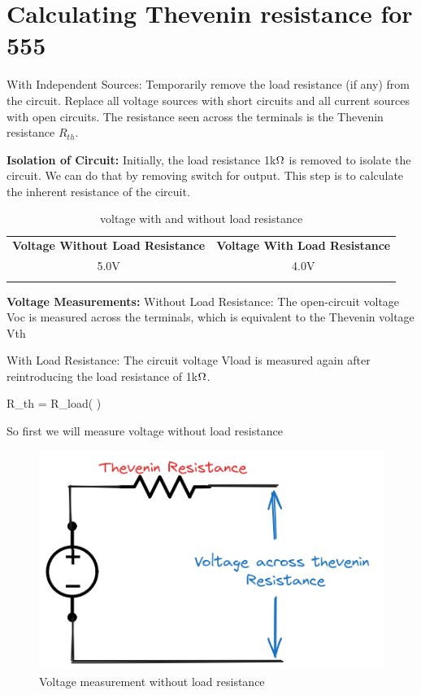 \documentclass[a4paper,11pt]{article}%
\begin{document}
\section{Calculating Thevenin resistance for 555}

With Independent Sources: Temporarily remove the load resistance (if any) from the circuit. Replace all voltage sources with short circuits and all current sources with open circuits. The resistance seen across the terminals is the Thevenin resistance $R_{th}$.

	\textbf{Isolation of Circuit:} Initially, the load resistance 1k$\ohm$ is removed to isolate the circuit. We can do that by removing switch for output. This step is to calculate the inherent resistance of the circuit.


	\begin{table}[H]
		\centering
	
		\begin{tabular}{c c}
	
			\textbf{Voltage Without Load Resistance}&\textbf{Voltage With Load Resistance}\\
			
			5.0V&4.0V\\\vspace{0.5cm}

		\end{tabular}
		\caption{voltage with and without load resistance}
		\label{voltagewithandwithoutresistance}
	\end{table}

	\textbf{Voltage Measurements:}
		Without Load Resistance: The open-circuit voltage Voc
  is measured across the terminals, which is equivalent to the Thevenin voltage Vth

		With Load Resistance: The circuit voltage Vload
  is measured again after reintroducing the load resistance of 1k$\ohm$.

	\begin{flalign*}
	\label{equation_th}
	R_{th} = R_{load}\left( \right)
	\end{flalign*}

	\pagebreak

	So first we will measure voltage without load resistance

	\begin{figure}[H]
		\centering
		\includegraphics[scale=0.6]{figures/open_th.png}
		\caption{Voltage measurement without load resistance}
	\end{figure}
\end{document}
